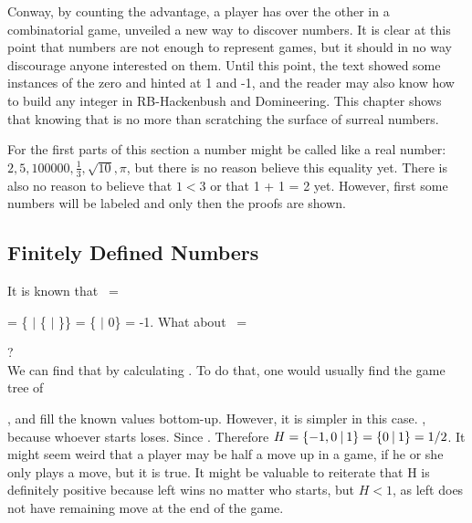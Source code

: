 
Conway, by counting the advantage, a player has over the other in a combinatorial game, unveiled a new way to discover numbers. It is clear at this point that numbers are not enough to represent games, but it should in no way discourage anyone interested on them. Until this point, the text showed some instances of the zero and hinted at 1 and -1, and the reader may also know how to build any integer in RB-Hackenbush and Domineering. This chapter shows that knowing that is no more than scratching the surface of surreal numbers.

For the first parts of this section a number  might be called like a real number: $2, 5, 100000, \frac{1}{3}, \sqrt{10}, \pi$, but there is no reason believe this equality yet. There is also no reason to believe that $1 < 3$ or that 1 + 1 = 2 yet. However, first some numbers will be labeled and only then the proofs are shown.


\subsection*{Finitely Defined Numbers}

It is known that \Gm\ =
 = \{ $|$ \{ $|$ \}\} = \{ $|$ 0\} = -1.
What about \Hm\ =  ?\\


We can find that by calculating . To do that, one would usually find the game tree of 
, and fill the known values bottom-up. However, it is simpler in this case. , because whoever starts loses. Since . Therefore $H = \mbox{$\{{-}1, 0\:|\:1\}$} = \mbox{$\{0\:|\:1\}$} = 1/2$. It might seem weird that a player may be half a move up in a game, if he or she only plays a move, but it is true. It might be valuable to reiterate that H is definitely positive because left wins no matter who starts, but $H < 1$, as left does not have remaining move at the end of the game.

